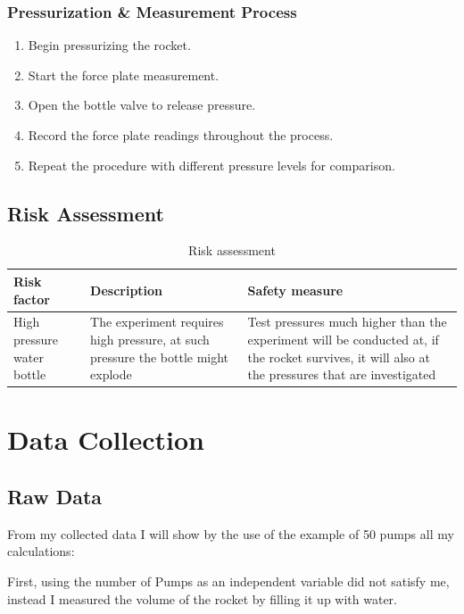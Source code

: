 \documentclass[12pt,a4paper]{article}
\begin{document}
\subsubsection{Pressurization \& Measurement Process}
\begin{enumerate}
\item Begin pressurizing the rocket.
\item Start the force plate measurement.
\item Open the bottle valve to release pressure.
\item Record the force plate readings throughout the process.
\item Repeat the procedure with different pressure levels for comparison.
\end{enumerate}

\subsection{Risk Assessment}

\begin{table}[H]
\centering
\caption{Risk assessment}
\begin{tabular}{@{}p{4cm}p{6cm}p{6cm}@{}}
\toprule
\textbf{Risk factor} & \textbf{Description} & \textbf{Safety measure} \\
\midrule
High pressure water bottle & The experiment requires high pressure, at such pressure the bottle might explode & Test pressures much higher than the experiment will be conducted at, if the rocket survives, it will also at the pressures that are investigated \\
\bottomrule
\end{tabular}
\end{table}

\section{Data Collection}

\subsection{Raw Data}

From my collected data I will show by the use of the example of 50 pumps all my calculations:

First, using the number of Pumps as an independent variable did not satisfy me, instead I measured the volume of the rocket by filling it up with water.
\end{document}
